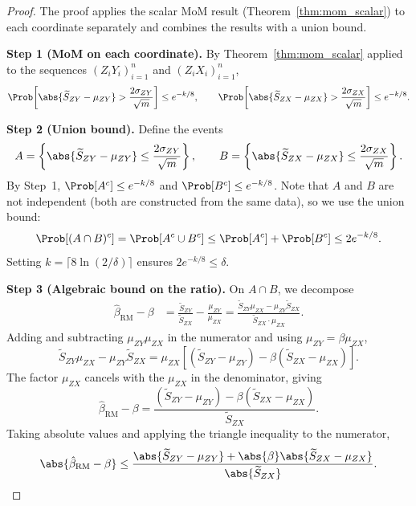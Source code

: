 \begin{proof}
The proof applies the scalar MoM result (Theorem~\ref{thm:mom_scalar}) to each coordinate separately and combines the results with a union bound.

\medskip\noindent\textbf{Step 1 (MoM on each coordinate).} By Theorem~\ref{thm:mom_scalar} applied to the sequences $(Z_iY_i)_{i=1}^{n}$ and $(Z_iX_i)_{i=1}^{n}$,
\[
    \Prob\!\left[\abs{\widetilde{S}_{ZY} - \mu_{ZY}} > \frac{2\sigma_{ZY}}{\sqrt{m}}\right] \leq e^{-k/8}, \qquad
    \Prob\!\left[\abs{\widetilde{S}_{ZX} - \mu_{ZX}} > \frac{2\sigma_{ZX}}{\sqrt{m}}\right] \leq e^{-k/8}.
\]

\medskip\noindent\textbf{Step 2 (Union bound).} Define the events
\[
    A = \left\{\abs{\widetilde{S}_{ZY} - \mu_{ZY}} \leq \frac{2\sigma_{ZY}}{\sqrt{m}}\right\}, \qquad B = \left\{\abs{\widetilde{S}_{ZX} - \mu_{ZX}} \leq \frac{2\sigma_{ZX}}{\sqrt{m}}\right\}.
\]
By Step~1, $\Prob[A^c] \leq e^{-k/8}$ and $\Prob[B^c] \leq e^{-k/8}$. Note that $A$ and $B$ are not independent (both are constructed from the same data), so we use the union bound:
\[
    \Prob[(A \cap B)^c] = \Prob[A^c \cup B^c] \leq \Prob[A^c] + \Prob[B^c] \leq 2e^{-k/8}.
\]
Setting $k = \lceil 8\ln(2/\delta)\rceil$ ensures $2e^{-k/8} \leq \delta$.

\medskip\noindent\textbf{Step 3 (Algebraic bound on the ratio).} On $A \cap B$, we decompose
\begin{align*}
    \hat{\beta}_{\mathrm{RM}} - \beta
    &= \frac{\widetilde{S}_{ZY}}{\widetilde{S}_{ZX}} - \frac{\mu_{ZY}}{\mu_{ZX}}
    = \frac{\widetilde{S}_{ZY}\mu_{ZX} - \mu_{ZY}\widetilde{S}_{ZX}}{\widetilde{S}_{ZX}\cdot\mu_{ZX}}.
\end{align*}
Adding and subtracting $\mu_{ZY}\mu_{ZX}$ in the numerator and using $\mu_{ZY} = \beta\mu_{ZX}$,
\[
    \widetilde{S}_{ZY}\mu_{ZX} - \mu_{ZY}\widetilde{S}_{ZX}
    = \mu_{ZX}\!\left[(\widetilde{S}_{ZY} - \mu_{ZY}) - \beta(\widetilde{S}_{ZX} - \mu_{ZX})\right].
\]
The factor $\mu_{ZX}$ cancels with the $\mu_{ZX}$ in the denominator, giving
\[
    \hat{\beta}_{\mathrm{RM}} - \beta = \frac{(\widetilde{S}_{ZY} - \mu_{ZY}) - \beta(\widetilde{S}_{ZX} - \mu_{ZX})}{\widetilde{S}_{ZX}}.
\]
Taking absolute values and applying the triangle inequality to the numerator,
\[
    \abs{\hat{\beta}_{\mathrm{RM}} - \beta} \leq \frac{\abs{\widetilde{S}_{ZY} - \mu_{ZY}} + \abs{\beta}\abs{\widetilde{S}_{ZX} - \mu_{ZX}}}{\abs{\widetilde{S}_{ZX}}}.
\]


\end{proof}
